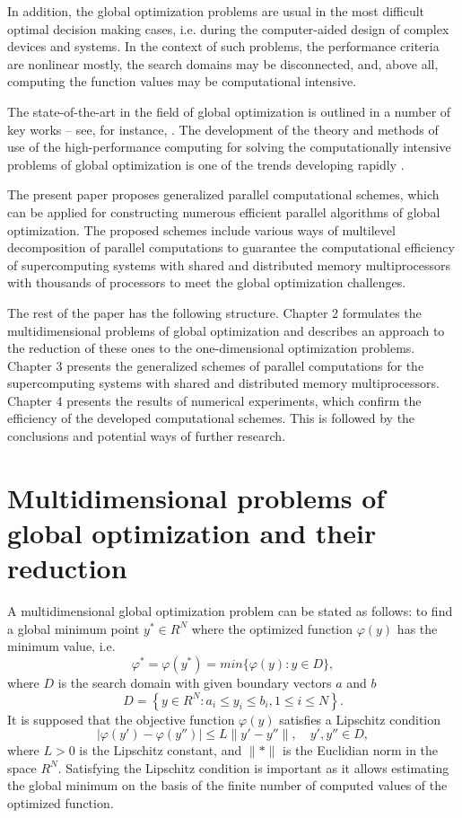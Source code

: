\documentclass[12pt]{amsart}
\begin{document}
In addition, the global optimization problems are usual in the most difficult optimal decision making cases, i.e. during the computer-aided design of complex devices and systems. In the context of such problems, the performance criteria are nonlinear mostly, the search domains may be disconnected, and, above all, computing the function values may be computational intensive.

The state-of-the-art in the field of global optimization is outlined in a number of key works – see, for instance, \cite{Floudas, Locatelli, Strongin1, Pardalos, Sergeyev1, Paulavicius}. The development of the theory and methods of use of the high-performance computing for solving the computationally intensive problems of global optimization is one of the trends developing rapidly \cite{Strongin1, Ciegis, Luque, Strongin2}.

The present paper proposes generalized parallel computational schemes, which can be applied for constructing numerous efficient parallel algorithms of global optimization. The proposed schemes include various ways of multilevel decomposition of parallel computations to guarantee the computational efficiency of supercomputing systems with shared and distributed memory multiprocessors with thousands of processors to meet the global optimization challenges.

The rest of the paper has the following structure. Chapter 2 formulates the multidimensional problems of global optimization and describes an approach to the reduction of these ones to the one-dimensional optimization problems. Chapter 3 presents the generalized schemes of parallel computations for the supercomputing systems with shared and distributed memory multiprocessors. Chapter 4 presents the results of numerical experiments, which confirm the efficiency of the developed computational schemes. This is followed by the conclusions and potential ways of further research.


\section{Multidimensional problems of global optimization and their reduction}

A multidimensional global optimization problem can be stated as follows: to find a global minimum point $y^\ast \in R^N$ where the optimized function $\varphi(y)$ has the minimum value, i.e.
\begin{equation}
\varphi^\ast = \varphi(y^\ast) = min \{\varphi(y): y\in D \},
\end{equation}
where $D$ is the search domain with given boundary vectors $a$ and $b$
\[
D=\left\{y\in R^N: a_i\leq y_i \leq b_i, 1\leq i \leq N\right\}.
\]
It is supposed that the objective function $\varphi(y)$ satisfies a Lipschitz condition
\begin{equation}
\vert \varphi(y') - \varphi(y'') \vert \leq L\| y' - y'' \|, \quad y', y'' \in D,
\end{equation}
where $L > 0$ is the Lipschitz constant, and $\|\ast\|$ is the Euclidian norm in the space $R^N$. Satisfying the Lipschitz condition is important as it allows estimating the global minimum on the basis of the finite number of computed values of the optimized function.
\end{document}
